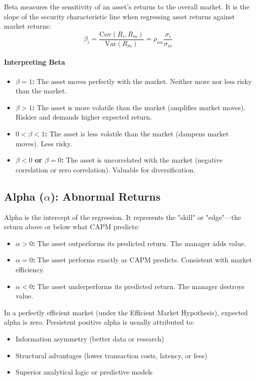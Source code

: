 Beta measures the sensitivity of an asset's returns to the overall market. It is the slope of the security characteristic line when regressing asset returns against market returns:
\begin{equation}
    \beta_i = \frac{\text{Cov}(R_i, R_m)}{\text{Var}(R_m)} = \rho_{im} \frac{\sigma_i}{\sigma_m}
\end{equation}

\paragraph{Interpreting Beta}
\begin{itemize}
    \item \textbf{$\beta = 1$:} The asset moves perfectly with the market. Neither more nor less risky than the market.
    
    \item \textbf{$\beta > 1$:} The asset is more volatile than the market (amplifies market moves). Riskier and demands higher expected return.
    
    \item \textbf{$0 < \beta < 1$:} The asset is less volatile than the market (dampens market moves). Less risky.
    
    \item \textbf{$\beta < 0$ or $\beta = 0$:} The asset is uncorrelated with the market (negative correlation or zero correlation). Valuable for diversification.
\end{itemize}

\subsection{Alpha ($\alpha$): Abnormal Returns}

Alpha is the intercept of the regression. It represents the "skill" or "edge"—the return above or below what CAPM predicts:
\begin{itemize}
    \item \textbf{$\alpha > 0$:} The asset outperforms its predicted return. The manager adds value.
    \item \textbf{$\alpha = 0$:} The asset performs exactly as CAPM predicts. Consistent with market efficiency.
    \item \textbf{$\alpha < 0$:} The asset underperforms its predicted return. The manager destroys value.
\end{itemize}

In a perfectly efficient market (under the Efficient Market Hypothesis), expected alpha is zero. Persistent positive alpha is usually attributed to:
\begin{itemize}
    \item Information asymmetry (better data or research)
    \item Structural advantages (lower transaction costs, latency, or fees)
    \item Superior analytical logic or predictive models
\end{itemize}

